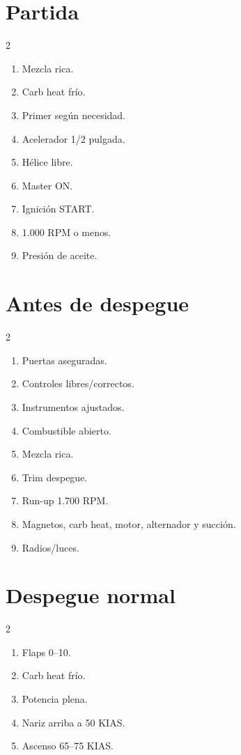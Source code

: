 \documentclass[11pt,oneside]{book}
\newenvironment{checklist}{\begin{enumerate}[label=\arabic*.]}{\end{enumerate}}
\begin{document}
\section*{Partida}
\begin{multicols}{2}
\begin{checklist}
\item Mezcla rica.
\item Carb heat frío.
\item Primer según necesidad.
\item Acelerador 1/2 pulgada.
\item Hélice libre.
\item Master ON.
\item Ignición START.
\item 1.000 RPM o menos.
\item Presión de aceite.
\end{checklist}
\end{multicols}

\section*{Antes de despegue}
\begin{multicols}{2}
\begin{checklist}
\item Puertas aseguradas.
\item Controles libres/correctos.
\item Instrumentos ajustados.
\item Combustible abierto.
\item Mezcla rica.
\item Trim despegue.
\item Run-up 1.700 RPM.
\item Magnetos, carb heat, motor, alternador y succión.
\item Radios/luces.
\end{checklist}
\end{multicols}

\section*{Despegue normal}
\begin{multicols}{2}
\begin{checklist}
\item Flaps 0--10\textdegree.
\item Carb heat frío.
\item Potencia plena.
\item Nariz arriba a 50 KIAS.
\item Ascenso 65--75 KIAS.
\end{checklist}
\end{multicols}
\end{document}
